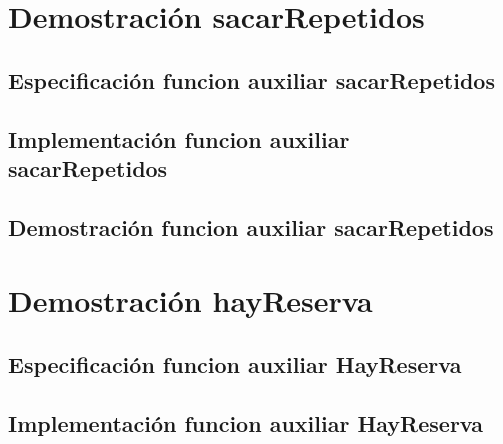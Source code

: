 \documentclass[a4paper]{article}
\begin{document}


\newpage

\section{Demostraci\'on sacarRepetidos}

\subsection{Especificaci\'on funcion auxiliar sacarRepetidos}



\subsection{Implementaci\'on funcion auxiliar sacarRepetidos}



\subsection{Demostraci\'on funcion auxiliar sacarRepetidos}



\newpage

\section{Demostraci\'on hayReserva}

\subsection{Especificaci\'on funcion auxiliar HayReserva}



\subsection{Implementaci\'on funcion auxiliar HayReserva}


\end{document}
